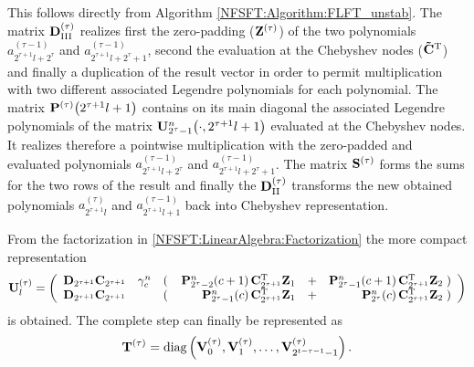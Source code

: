 This follows directly from Algorithm \ref{NFSFT:Algorithm:FLFT_unstab}. The matrix $\mathbf{D}^{(\tau)}_{\text{III}}$ realizes first the zero-padding ($\mathbf{Z}^{(\tau)}$)
of the two polynomials $a^{(\tau-1)}_{2^{\tau+1}l+2^{\tau}}$ and $a^{(\tau-1)}_{2^{\tau+1}l+2^{\tau}+1}$, second the evaluation at the Chebyshev nodes ($\mathbf{\tilde{C}}^{\text{\rm{T}}}$) and finally a duplication of the result vector in order to permit multiplication with two different associated Legendre polynomials for each polynomial. The matrix $\mathbf{P}^{(\tau)}{\hspace{-0.4ex}}\left(2^{\tau+1}l+1\right)$ contains on its main diagonal the associated Legendre polynomials of the matrix $\mathbf{U}_{2^{\tau}-1}^n{\hspace{-0.4ex}}\left(\cdot,2^{\tau+1}l+1\right)$ evaluated at the Chebyshev nodes. It realizes therefore a pointwise multiplication with the zero-padded and evaluated polynomials $a^{(\tau-1)}_{2^{\tau+1}l+2^{\tau}}$ and $a^{(\tau-1)}_{2^{\tau+1}l+2^{\tau}+1}$. The matrix $\mathbf{S}^{(\tau)}$ forms the sums for the two rows of the result and finally the $\mathbf{D}^{(\tau)}_{\text{II}}$ transforms the new obtained polynomials $a^{(\tau)}_{2^{\tau+1}l}$ and $a^{(\tau-1)}_{2^{\tau+1}l+1}$ back into Chebyshev representation.

From the factorization in \eqref{NFSFT:LinearAlgebra:Factorization} the more compact representation
\begin{equation}
\label{UCompact}
\mathbf{U}^{(\tau)}_l = 
\left(\begin{array}{lclrcr}
  \mathbf{D}_{2^{\tau+1}} \mathbf{C}_{2^{\tau+1}} & \gamma_{c}^n & \left(\right. & \mathbf{P}_{2^{\tau}-2}^n{\hspace{-0.4ex}}\left(c+1\right) \mathbf{C}^{\text{\rm{T}}}_{2^{\tau+1}} \mathbf{Z}_{1} & + & 
  \mathbf{P}_{2^{\tau}-1}^n{\hspace{-0.4ex}}\left(c+1\right) \mathbf{C}^{\text{\rm{T}}}_{2^{\tau+1}} \mathbf{Z}_{2} \left.\right) \\
  \mathbf{D}_{2^{\tau+1}} \mathbf{C}_{2^{\tau+1}} & & \left(\right. & \mathbf{P}_{2^{\tau}-1}^n{\hspace{-0.4ex}}\left(c\right) \mathbf{C}^{\text{\rm{T}}}_{2^{\tau+1}} \mathbf{Z}_{1} & + & 
  \mathbf{P}_{2^{\tau}}^n{\hspace{-0.4ex}}\left(c\right) \mathbf{C}^{\text{\rm{T}}}_{2^{\tau+1}} \mathbf{Z}_{2} \left.\right)
\end{array}\right)
\end{equation}
is obtained.
The complete step can finally be represented as \[\mathbf{T}^{(\tau)} = \text{diag}\left(\mathbf{V}^{(\tau)}_0,\mathbf{V}^{(\tau)}_1,\dots,\mathbf{V}^{(\tau)}_{2^{t-\tau-1}-1}\right).\]

